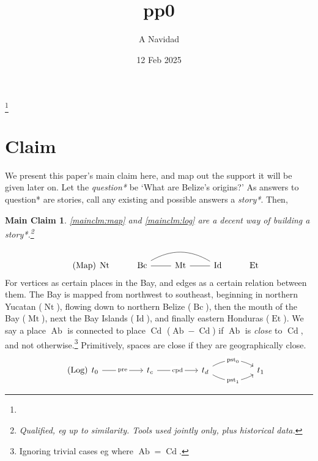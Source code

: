 \documentclass{amsart}
\newcommand{\mention}[1]{\textit{#1}}%
\DeclareMathOperator{\ab}{Ab}%
\DeclareMathOperator{\cd}{Cd}%
\DeclareMathOperator{\id}{Id}%
\DeclareMathOperator{\mt}{Mt}%
\DeclareMathOperator{\bc}{Bc}%
\DeclareMathOperator{\et}{Et}%
\DeclareMathOperator{\nt}{Nt}%
\DeclareMathOperator{\pre}{pre}%
\DeclareMathOperator{\pst}{pst}%
\DeclareMathOperator{\cpd}{cpd}%
\newtheorem{mainclm}{Main Claim}%
\theoremstyle{definition}
\theoremstyle{remark}
\begin{document}
%
%
\label{start}
\title{pp0}
\author{A Navidad}
\address{Harvard College, Cambridge MA}
\date{12 Feb 2025}
\thanks{}%
\begin{abstract}
\end{abstract}
\keywords{}
\maketitle
%
%
%
\section{Claim}
	\label{s:claim}
	We present this paper's main claim here, and map out the support it will be given later on. Let the \mention{question*} be `What are Belize's origins?' As answers to question* are stories, call any existing and possible answers a \mention{story*}. Then,
	\begin{mainclm}
	\label{mainclm:1}
	\ref{mainclm:map} and \ref{mainclm:log} are a decent way of building a story*.\footnote{Qualified, eg up to similarity. Tools used jointly only, plus historical data.}
	\end{mainclm}
	\begin{equation}
	\tag{Map}
	\label{mainclm:map}
		\begin{tikzcd}[arrows=dash]
		\nt &\bc \rar \ar[rr,bend left] &\mt \rar &\id &\et
		\end{tikzcd}
	\end{equation}
	For vertices as certain places in the Bay, and edges as a certain relation between them. The Bay is mapped from northwest to southeast, beginning in northern Yucatan (\(\nt\)), flowing down to northern Belize (\(\bc\)), then the mouth of the Bay (\(\mt\)), next the Bay Islands (\(\id\)), and finally eastern Honduras (\(\et\)). We say a place \(\ab\) is connected to place \(\cd\) (\(\ab-\cd\)) if \(\ab\) is \mention{close} to \(\cd\), and not otherwise.\footnote{Ignoring trivial cases eg where \(\ab=\cd\).} Primitively, spaces are close if they are geographically close.
	\begin{equation}
	\tag{Log}
	\label{mainclm:log}
		\begin{tikzcd}[sep=huge]
		t_{0} \rar["\pre" description] &t_{c} \rar["\cpd" description] &t_{d} \rar[bend left,"\pst_{0}" description] \rar[bend right,"\pst_{1}" description] &t_{1}
		\end{tikzcd}
	\end{equation}
\end{document}
